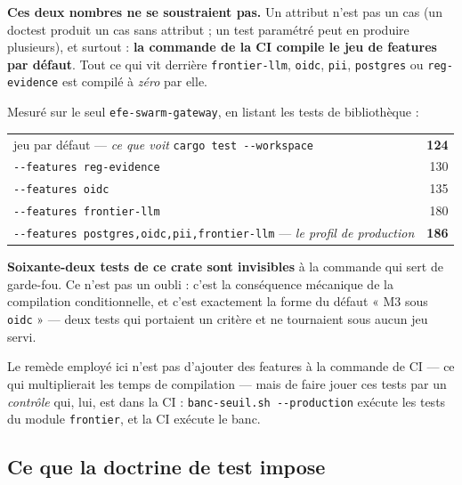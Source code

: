 \documentclass[10pt]{report}
\newcommand{\code}[1]{\texttt{\small #1}}
\newcommand{\att}[1]{\textcolor{amber}{\textbf{#1}}}
\begin{document}
\att{Ces deux nombres ne se soustraient pas.} Un attribut n'est pas un cas (un doctest produit un cas
sans attribut ; un test paramétré peut en produire plusieurs), et surtout : \textbf{la commande de la
CI compile le jeu de features par défaut}. Tout ce qui vit derrière \code{frontier-llm},
\code{oidc}, \code{pii}, \code{postgres} ou \code{reg-evidence} est compilé à \emph{zéro} par elle.

\begin{alerte}
Mesuré sur le seul \code{efe-swarm-gateway}, en listant les tests de bibliothèque :

\medskip
\begin{tabular}{@{}p{7.6cm}r@{}}
jeu par défaut --- \emph{ce que voit} \code{cargo test -{}-workspace} & \textbf{124} \\
\code{-{}-features reg-evidence} & 130 \\
\code{-{}-features oidc} & 135 \\
\code{-{}-features frontier-llm} & 180 \\
\code{-{}-features postgres,oidc,pii,frontier-llm} --- \emph{le profil de production} & \textbf{186} \\
\end{tabular}

\medskip
\textbf{Soixante-deux tests de ce crate sont invisibles} à la commande qui sert de garde-fou. Ce
n'est pas un oubli : c'est la conséquence mécanique de la compilation conditionnelle, et c'est
exactement la forme du défaut « M3 sous \code{oidc} » --- deux tests qui portaient un critère et ne
tournaient sous aucun jeu servi.
\end{alerte}

Le remède employé ici n'est pas d'ajouter des features à la commande de CI --- ce qui multiplierait
les temps de compilation --- mais de faire jouer ces tests par un \emph{contrôle} qui, lui, est dans
la CI : \code{banc-seuil.sh -{}-production} exécute les tests du module \code{frontier}, et la CI
exécute le banc.

\subsection{Ce que la doctrine de test impose}
\end{document}
